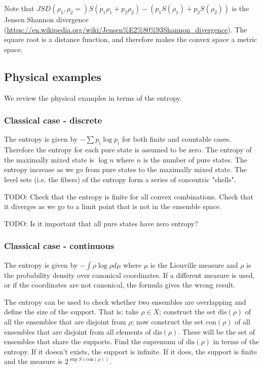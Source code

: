 \documentclass[11pt]{article}
\begin{document}
\begin{remark}
	Note that $JSD(\rho_1, \rho_2 = )S(p_1\rho_1 + p_2 \rho_2) - (p_1 S(\rho_1) + p_2 S(\rho_2))$ is the Jensen Shannon divergence (\url{https://en.wikipedia.org/wiki/Jensen%E2%80%93Shannon_divergence}). The square root is a distance function, and therefore makes the convex space a metric space.
\end{remark}

\subsection{Physical examples}

We review the physical examples in terms of the entropy.

\subsubsection{Classical case - discrete}

The entropy is given by $-\sum p_i \log p_i$ for both finite and countable cases. Therefore the entropy for each pure state is assumed to be zero. The entropy of the maximally mixed state is $\log n$ where $n$ is the number of pure states. The entropy increase as we go from pure states to the maximally mixed state. The level sets (i.e. the fibers) of the entropy form a series of concentric "shells".

TODO: Check that the entropy is finite for all convex combinations. Check that it diverges as we go to a limit point that is not in the ensemble space.

TODO: Is it important that all pure states have zero entropy?

\subsubsection{Classical case - continuous}

The entropy is given by $- \int \rho \log \rho d\mu$ where $\mu$ is the Liouville measure and $\rho$ is the probability density over canonical coordinates. If a different measure is used, or if the coordinates are not canonical, the formula gives the wrong result.

The entropy can be used to check whether two ensembles are overlapping and define the size of the support. That is: take $\rho \in X$; construct the set $\text{dis}(\rho)$ of all the ensembles that are disjoint from $\rho$; now construct the set $\text{con}(\rho)$ of all ensembles that are disjoint from all elements of $\text{dis}(\rho)$. These will be the set of ensembles that share the supports. Find the supremum of $\text{dis}(\rho)$ in terms of the entropy. If it doesn't exists, the support is infinite. If it does, the support is finite and the measure is $2^{\sup S(\text{con}(\rho))}$.
\end{document}
